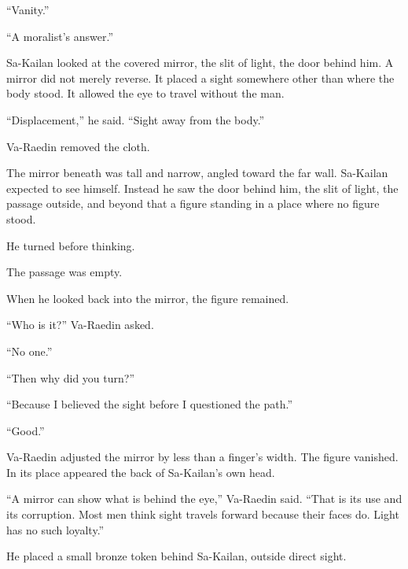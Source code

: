 “Vanity.”\par

“A moralist’s answer.”\par

Sa-Kailan looked at the covered mirror, the slit of light, the door behind him.
A mirror did not merely reverse.
It placed a sight somewhere other than where the body stood.
It allowed the eye to travel without the man.\par

“Displacement,” he said.
“Sight away from the body.”\par

Va-Raedin removed the cloth.\par

The mirror beneath was tall and narrow, angled toward the far wall.
Sa-Kailan expected to see himself.
Instead he saw the door behind him, the slit of light, the passage outside, and beyond that a figure standing in a place where no figure stood.\par

He turned before thinking.\par

The passage was empty.\par

When he looked back into the mirror, the figure remained.\par

“Who is it?” Va-Raedin asked.\par

“No one.”\par

“Then why did you turn?”\par

“Because I believed the sight before I questioned the path.”\par

“Good.”\par

Va-Raedin adjusted the mirror by less than a finger’s width.
The figure vanished.
In its place appeared the back of Sa-Kailan’s own head.\par

“A mirror can show what is behind the eye,” Va-Raedin said.
“That is its use and its corruption.
Most men think sight travels forward because their faces do.
Light has no such loyalty.”\par

He placed a small bronze token behind Sa-Kailan, outside direct sight.\par

